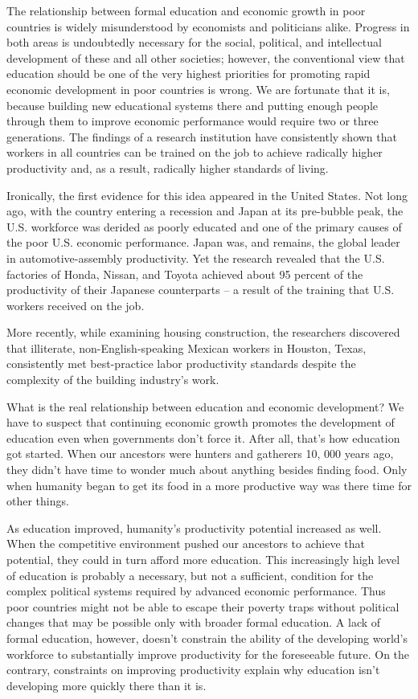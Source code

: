 The relationship between formal education and economic growth in poor countries is widely misunderstood by economists and politicians alike. Progress in both areas is undoubtedly necessary for the social, political, and intellectual development of these and all other societies; however, the conventional view that education should be one of the very highest priorities for promoting rapid economic development in poor countries is wrong. We are fortunate that it is, because building new educational systems there and putting enough people through them to improve economic performance would require two or three generations. The findings of a research institution have consistently shown that workers in all countries can be trained on the job to achieve radically higher productivity and, as a result, radically higher standards of living.


Ironically, the first evidence for this idea appeared in the United States. Not long ago, with the country entering a recession and Japan at its pre-bubble peak, the U.S. workforce was derided as poorly educated and one of the primary causes of the poor U.S. economic performance. Japan was, and remains, the global leader in automotive-assembly productivity. Yet the research revealed that the U.S. factories of Honda, Nissan, and Toyota achieved about 95 percent of the productivity of their Japanese counterparts – a result of the training that U.S. workers received on the job.


More recently, while examining housing construction, the researchers discovered that illiterate, non-English-speaking Mexican workers in Houston, Texas, consistently met best-practice labor productivity standards despite the complexity of the building industry's work.


What is the real relationship between education and economic development? We have to suspect that continuing economic growth promotes the development of education even when governments don't force it. After all, that's how education got started. When our ancestors were hunters and gatherers 10, 000 years ago, they didn't have time to wonder much about anything besides finding food. Only when humanity began to get its food in a more productive way was there time for other things.


As education improved, humanity's productivity potential increased as well. When the competitive environment pushed our ancestors to achieve that potential, they could in turn afford more education. This increasingly high level of education is probably a necessary, but not a sufficient, condition for the complex political systems required by advanced economic performance. Thus poor countries might not be able to escape their poverty traps without political changes that may be possible only with broader formal education. A lack of formal education, however, doesn't constrain the ability of the developing world's workforce to substantially improve productivity for the foreseeable future. On the contrary, constraints on improving productivity explain why education isn't developing more quickly there than it is.